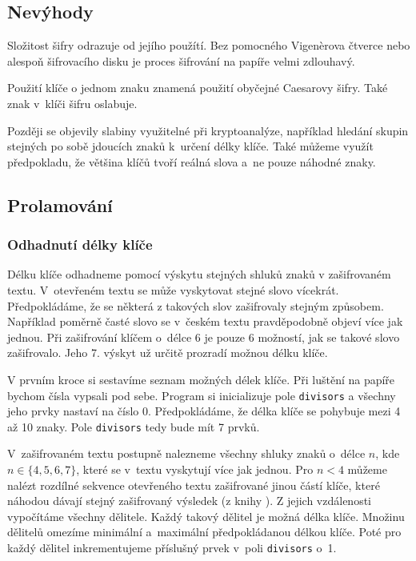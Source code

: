\documentclass[glossaries, index]{kidiplom}
\begin{document}
\subsection{Nevýhody}
Složitost šifry odrazuje od jejího použítí. Bez pomocného Vigenèrova čtverce nebo alespoň šifrovacího disku je proces šifrování na papíře velmi zdlouhavý.

Použití klíče o jednom znaku znamená použití obyčejné Caesarovy šifry. Také znak  v~klíči šifru oslabuje.

Později se objevily slabiny využitelné při kryptoanalýze, například hledání skupin stejných po sobě jdoucích znaků k~určení délky klíče. Také můžeme využít předpokladu, že většina klíčů tvoří reálná slova a~ne pouze náhodné  znaky.

\subsection{Prolamování}
\subsubsection{Odhadnutí délky klíče}
\label{vigenere-delka_klice}
Délku klíče odhadneme pomocí výskytu stejných shluků znaků v zašifrovaném textu. V~otevřeném textu se může vyskytovat stejné slovo vícekrát. Předpokládáme, že se některá z takových slov zašifrovaly stejným způsobem. Například poměrně časté slovo  se v~českém textu pravděpodobně objeví více jak jednou. Při zašifrování klíčem o~délce 6 je pouze 6 možností, jak se takové slovo zašifrovalo. Jeho 7. výskyt už určitě prozradí možnou délku klíče.

V prvním kroce si sestavíme seznam možných délek klíče. Při luštění na papíře bychom čísla vypsali pod sebe. Program si inicializuje pole \texttt{divisors} a všechny jeho prvky nastaví na číslo 0. Předpokládáme, že délka klíče se pohybuje mezi 4 až 10 znaky. Pole \texttt{divisors} tedy bude mít 7 prvků.

V~zašifrovaném textu postupně nalezneme všechny shluky znaků o~délce $n$, kde~$n \in \{4, 5, 6, 7\}$, které se v~textu vyskytují více jak jednou. Pro $n < 4$ můžeme nalézt rozdílné sekvence otevřeného textu zašifrované jinou částí klíče, které náhodou dávají stejný zašifrovaný výsledek (z knihy \cite{singh2009}). Z jejich vzdálenosti vypočítáme všechny dělitele. Každý takový dělitel je možná délka klíče. Množinu dělitelů omezíme minimální a~maximální předpokládanou délkou klíče. Poté pro každý dělitel inkrementujeme příslušný prvek v~poli \texttt{divisors} o~1. 
\end{document}
